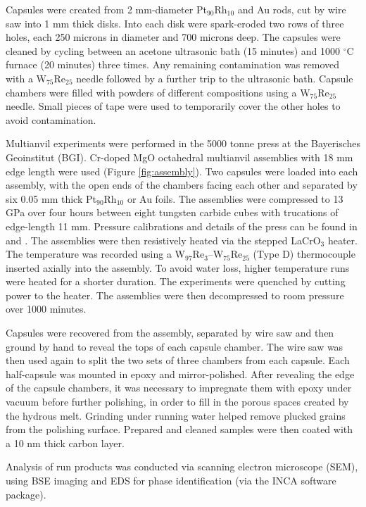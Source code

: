 \documentclass[review]{elsarticle}
\begin{document}
Capsules were created from 2 mm-diameter Pt$_{90}$Rh$_{10}$ and Au rods, cut by wire saw into 1 mm thick disks. Into each disk were spark-eroded two rows of three holes, each 250 microns in diameter and 700 microns deep. The capsules were cleaned by cycling between an acetone ultrasonic bath (15 minutes) and 1000 $^{\circ}$C furnace (20 minutes) three times. Any remaining contamination was removed with a W$_{75}$Re$_{25}$ needle followed by a further trip to the ultrasonic bath. Capsule chambers were filled with powders of different compositions using a W$_{75}$Re$_{25}$ needle. Small pieces of tape were used to temporarily cover the other holes to avoid contamination. 

Multianvil experiments were performed in the 5000 tonne press at the Bayerisches Geoinstitut (BGI). Cr-doped MgO octahedral multianvil assemblies with 18 mm edge length were used (Figure \ref{fig:assembly}). Two capsules were loaded into each assembly, with the open ends of the chambers facing each other and separated by six 0.05 mm thick Pt$_{90}$Rh$_{10}$ or Au foils. The assemblies were compressed to 13 GPa over four hours between eight tungsten carbide cubes with trucations of edge-length 11 mm. Pressure calibrations and details of the press can be found in \cite{FPTLDR2004} and \cite{KF2005}. The assemblies were then resistively heated via the stepped LaCrO$_3$ heater. The temperature was recorded using a W$_{97}$Re$_{3}$--W$_{75}$Re$_{25}$ (Type D) thermocouple inserted axially into the assembly. To avoid water loss, higher temperature runs were heated for a shorter duration. The experiments were quenched by cutting power to the heater. The assemblies were then decompressed to room pressure over 1000 minutes. 

Capsules were recovered from the assembly, separated by wire saw and then ground by hand to reveal the tops of each capsule chamber. The wire saw was then used again to split the two sets of three chambers from each capsule. Each half-capsule was mounted in epoxy and mirror-polished. After revealing the edge of the capsule chambers, it was necessary to impregnate them with epoxy under vacuum before further polishing, in order to fill in the porous spaces created by the hydrous melt. Grinding under running water helped remove plucked grains from the polishing surface. Prepared and cleaned samples were then coated with a 10 nm thick carbon layer.

Analysis of run products was conducted via scanning electron microscope (SEM), using BSE imaging and EDS for phase identification (via the INCA software package). 
\end{document}
